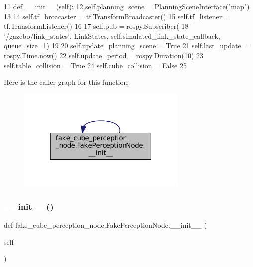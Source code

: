 \begin{DoxyCode}
11     \textcolor{keyword}{def }\hyperlink{classfake__cube__perception__node_1_1FakePerceptionNode_a6f5d90816c2222cf76bd632b5ad46457}{\_\_init\_\_}(self):
12         self.planning\_scene = PlanningSceneInterface(\textcolor{stringliteral}{"map"})
13 
14         self.tf\_broacaster = tf.TransformBroadcaster()
15         self.tf\_listener = tf.TransformListener()
16 
17         self.pub = rospy.Subscriber(
18             \textcolor{stringliteral}{'/gazebo/link\_states'}, LinkStates, self.simulated\_link\_state\_callback, queue\_size=1)
19 
20         self.update\_planning\_scene = \textcolor{keyword}{True}
21         self.last\_update = rospy.Time.now()
22         self.update\_period = rospy.Duration(10)
23         self.table\_collision = \textcolor{keyword}{True}
24         self.cube\_collision = \textcolor{keyword}{False}
25 
\end{DoxyCode}
Here is the caller graph for this function\+:
\nopagebreak
\begin{figure}[H]
\begin{center}
\leavevmode
\includegraphics[width=232pt]{classfake__cube__perception__node_1_1FakePerceptionNode_a6f5d90816c2222cf76bd632b5ad46457_icgraph}
\end{center}
\end{figure}
\mbox{\label{classfake__cube__perception__node_1_1FakePerceptionNode_a6f5d90816c2222cf76bd632b5ad46457}} 
\subsubsection{\texorpdfstring{\+\_\+\+\_\+init\+\_\+\+\_\+()}{\_\_init\_\_()}\hspace{0.1cm}{\footnotesize\ttfamily [2/3]}}
{\footnotesize\ttfamily def fake\+\_\+cube\+\_\+perception\+\_\+node.\+Fake\+Perception\+Node.\+\_\+\+\_\+init\+\_\+\+\_\+ (\begin{DoxyParamCaption}\item[{}]{self }\end{DoxyParamCaption})}



